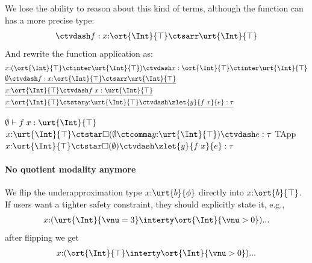 We lose the ability to reason about this kind of terms, although the function can has a more precise type:
\begin{align*}
  \ctvdash f : x{:}\ort{\Int}{\top} \ctsarr \urt{\Int}{\top}
\end{align*}\noindent
And rewrite the function application as:
\begin{align*}
  &x{:}(\ort{\Int}{\top} \ctinter \urt{\Int}{\top}) \ctvdash x : \ort{\Int}{\top} \ctinter \urt{\Int}{\top}
  \\&\underline{\emptyset \ctvdash f : x{:}\ort{\Int}{\top} \ctsarr \urt{\Int}{\top}}
  \\&\underline{x{:}\ort{\Int}{\top} \ctvdash f\;x : \urt{\Int}{\top}}
  \\&\underline{x{:}\ort{\Int}{\top} \ctstar y{:}\urt{\Int}{\top} \ctvdash \zlet{y}{f\;x}{e} : \tau}  
\end{align*}\noindent

\mprooftr{65mm}
  {$ \emptyset \vdash f\; x : \urt{\Int}{\top}$ \quad $x{:}\urt{\Int}{\top} \ctstar \Box (\emptyset \ctcomma y{:}\urt{\Int}{\top}) \ctvdash e : \tau$}
  {TApp}
  {$x{:}\urt{\Int}{\top} \ctstar \Box (\emptyset) \ctvdash \zlet{y}{f\;x}{e} : \tau$}



\paragraph{No quotient modality anymore} We flip the underapproximation type $x{:}\urt{b}{\phi}$ directly into $x{:}\ort{b}{\top}$. If users want a tighter safety constraint, they should explicitly state it, e.g.,
\begin{align*}
  x{:}(\urt{\Int}{\vnu = 3} \interty \ort{\Int}{\vnu > 0}) ...
\end{align*}\noindent
after flipping we get
\begin{align*}
  x{:}(\ort{\Int}{\top} \interty \ort{\Int}{\vnu > 0}) ...
\end{align*}\noindent

